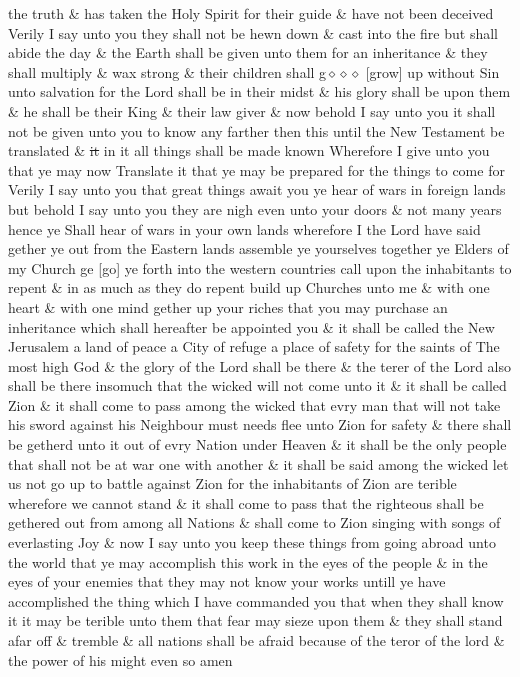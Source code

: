 the truth \& has taken the Holy Spirit for their guide \& have not been deceived Verily I say unto you they shall not be hewn down \& cast into the fire but shall abide the day \& the Earth shall be given unto them for an inheritance \& they shall multiply \& wax strong \& their children shall g$\diamond\diamond\diamond$ [grow] up without Sin unto salvation for the Lord shall be in their midst \& his glory shall be upon them \& he shall be their King \& their law giver \& now behold I say unto you it shall not be given unto you to know any farther then this until the New Testament be translated \& \sout{it} in it all things shall be made known Wherefore I give unto you that ye may now Translate it that ye may be prepared for the things to come for Verily I say unto you that great things await you ye hear of wars in foreign lands but behold I say unto you they are nigh even unto your doors \& not many years hence ye Shall hear of wars in your own lands wherefore I the Lord have said gether ye out from the Eastern lands assemble ye yourselves together ye Elders of my Church ge [go] ye forth into the western countries call upon the inhabitants to repent \& in as much as they do repent build up Churches unto me \& with one heart \& with one mind gether up your riches that you may purchase an inheritance which shall hereafter be appointed you \& it shall be called the New Jerusalem a land of peace a City of refuge a place of safety for the saints of The most high God \& the glory of the Lord shall be there \& the terer of the Lord also shall be there insomuch that the wicked will not come unto it \& it shall be called Zion \& it shall come to pass among the wicked that evry man that will not take his sword against his Neighbour must needs flee unto Zion for safety \& there shall be getherd unto it out of evry Nation under Heaven \& it shall be the only people that shall not be at war one with another \& it shall be said among the wicked let us not go up to battle against Zion for the inhabitants of Zion are terible wherefore we cannot stand \& it shall come to pass that the righteous shall be gethered out from among all Nations \& shall come to Zion singing with songs of everlasting Joy \& now I say unto you keep these things from going abroad unto the world that ye may accomplish this work in the eyes of the people \& in the eyes of your enemies that they may not know your works untill ye have accomplished the thing which I have commanded you that when they shall know it it may be terible unto them that fear may sieze upon them \& they shall stand afar off \& tremble \& all nations shall be afraid because of the teror of the lord \& the power of his might even so amen
				
